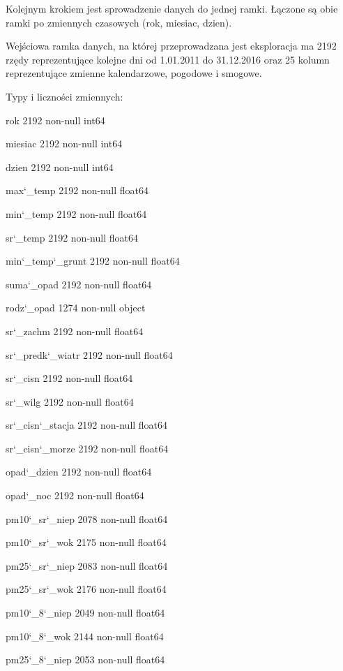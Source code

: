 \documentclass[a4paper,12pt,twoside,openany]{report}
\begin{document}
Kolejnym krokiem jest sprowadzenie danych do jednej ramki. Łączone są obie ramki po zmiennych czasowych (rok, miesiac, dzien).

Wejściowa ramka danych, na której przeprowadzana jest eksploracja ma 2192 rzędy reprezentujące kolejne dni od 1.01.2011 do 31.12.2016 oraz 25 kolumn reprezentujące zmienne kalendarzowe, pogodowe i smogowe.

Typy i liczności zmiennych:

rok               2192 non-null int64

miesiac           2192 non-null int64

dzien             2192 non-null int64

max\char`_temp          2192 non-null float64

min\char`_temp          2192 non-null float64

sr\char`_temp           2192 non-null float64

min\char`_temp\char`_grunt    2192 non-null float64

suma\char`_opad         2192 non-null float64

rodz\char`_opad         1274 non-null object

sr\char`_zachm          2192 non-null float64

sr\char`_predk\char`_wiatr    2192 non-null float64

sr\char`_cisn           2192 non-null float64

sr\char`_wilg           2192 non-null float64

sr\char`_cisn\char`_stacja    2192 non-null float64

sr\char`_cisn\char`_morze     2192 non-null float64

opad\char`_dzien        2192 non-null float64

opad\char`_noc          2192 non-null float64

pm10\char`_sr\char`_niep      2078 non-null float64

pm10\char`_sr\char`_wok       2175 non-null float64

pm25\char`_sr\char`_niep      2083 non-null float64

pm25\char`_sr\char`_wok       2176 non-null float64

pm10\char`_8\char`_niep       2049 non-null float64

pm10\char`_8\char`_wok        2144 non-null float64

pm25\char`_8\char`_niep       2053 non-null float64
\end{document}
